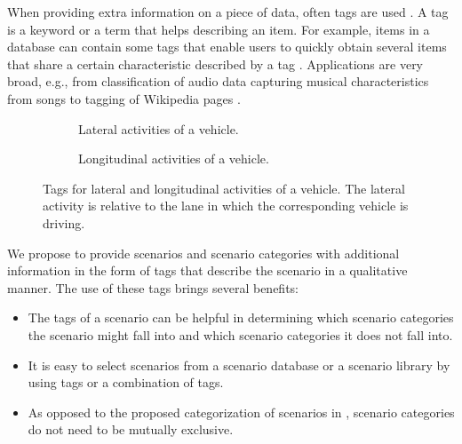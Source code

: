 When providing extra information on a piece of data, often tags are used \cite{smith2007tagging}. A tag is a keyword or a term that helps describing an item. For example, items in a database can contain some tags that enable users to quickly obtain several items that share a certain characteristic described by a tag \cite{craft2004tagging, vasquez2019controlling}. Applications are very broad, e.g., from classification of audio data \cite{kong2017joint} capturing musical characteristics from songs \cite{ellis2011semantic} to tagging of Wikipedia pages \cite{voss2006collaborative}.

\begin{figure}
	\centering
	\begin{subfigure}{\linewidth}
		\centering
		\caption{Lateral activities of a vehicle.\vspace{1em}}
		\label{fig:tree vehicle lat act}
	\end{subfigure}
	\begin{subfigure}{\linewidth}
		\centering
		\caption{Longitudinal activities of a vehicle.}
		\label{fig:tree vehicle long act}
	\end{subfigure}
	\caption{Tags for lateral and longitudinal activities of a vehicle. The lateral activity is relative to the lane in which the corresponding vehicle is driving.}
	\label{fig:tree vehicle activities}
\end{figure}

\cbstartc We propose to provide scenarios and scenario categories with additional information in the form of tags that describe the scenario in a qualitative manner.
\cbend
The use of these tags brings several benefits:
\begin{itemize}
	\item \cbstartd The tags of a scenario can be helpful in determining which scenario categories the scenario might fall into and which scenario categories it does not fall into.\cbend
	\item It is easy to select scenarios from a scenario database or a scenario library by using tags or a combination of tags.
	\item As opposed to the proposed categorization of scenarios in \cite{opdencamp2014cats, USDoT2007precrashscenarios, lenard2011typical, lara2019harmonized}, scenario categories do not need to be mutually exclusive.
\end{itemize}

